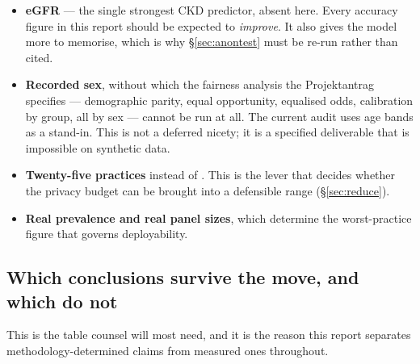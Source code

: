 \begin{itemize}
  \item \textbf{eGFR} --- the single strongest CKD predictor, absent here. Every accuracy figure in
        this report should be expected to \emph{improve}. It also gives the model more to memorise,
        which is why \S\ref{sec:anontest} must be re-run rather than cited.
  \item \textbf{Recorded sex}, without which the fairness analysis the Projektantrag specifies
        --- demographic parity, equal opportunity, equalised odds, calibration by group, all by sex
        --- cannot be run at all. The current audit uses age bands as a stand-in. This is not a
        deferred nicety; it is a specified deliverable that is impossible on synthetic data.
  \item \textbf{Twenty-five practices} instead of \NumPractices{}. This is the lever that decides
        whether the privacy budget can be brought into a defensible range (\S\ref{sec:reduce}).
  \item \textbf{Real prevalence and real panel sizes}, which determine the worst-practice figure
        that governs deployability.
\end{itemize}

\subsection{Which conclusions survive the move, and which do not}

This is the table counsel will most need, and it is the reason this report separates
methodology-determined claims from measured ones throughout.

